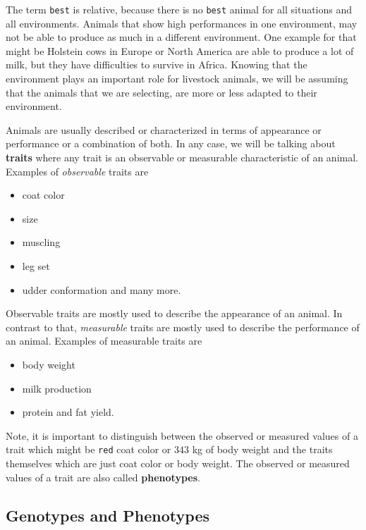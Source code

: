 \documentclass[
]{book}
\providecommand{\tightlist}{%
  \setlength{\itemsep}{0pt}\setlength{\parskip}{0pt}}
\begin{document}
The term \texttt{best} is relative, because there is no \texttt{best} animal for all situations and all environments. Animals that show high performances in one environment, may not be able to produce as much in a different environment. One example for that might be Holstein cows in Europe or North America are able to produce a lot of milk, but they have difficulties to survive in Africa. Knowing that the environment plays an important role for livestock animals, we will be assuming that the animals that we are selecting, are more or less adapted to their environment.

Animals are usually described or characterized in terms of appearance or performance or a combination of both. In any case, we will be talking about \textbf{traits} where any trait is an observable or measurable characteristic of an animal. Examples of \emph{observable} traits are

\begin{itemize}
\tightlist
\item
  coat color
\item
  size
\item
  muscling
\item
  leg set
\item
  udder conformation and many more.
\end{itemize}

Observable traits are mostly used to describe the appearance of an animal. In contrast to that, \emph{measurable} traits are mostly used to describe the performance of an animal. Examples of measurable traits are

\begin{itemize}
\tightlist
\item
  body weight
\item
  milk production
\item
  protein and fat yield.
\end{itemize}

Note, it is important to distinguish between the observed or measured values of a trait which might be \texttt{red} coat color or \(343\) kg of body weight and the traits themselves which are just coat color or body weight. The observed or measured values of a trait are also called \textbf{phenotypes}.

\hypertarget{geno-pheno}{%
\subsection{Genotypes and Phenotypes}\label{geno-pheno}}
\end{document}
